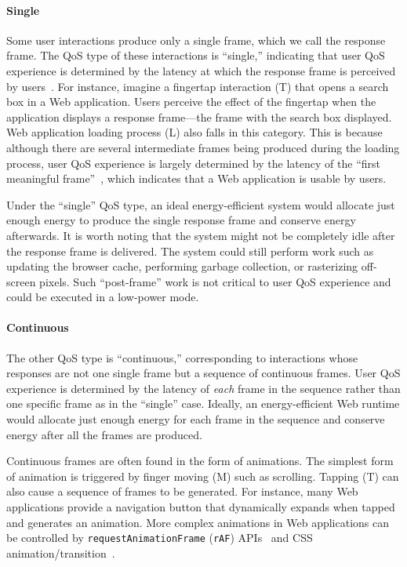 \paragraph{Single} Some user interactions produce only a single frame, which we call the response frame. The QoS type of these interactions is ``single,'' indicating that user QoS experience is determined by the latency at which the response frame is perceived by users~\cite{eventlatency}. For instance, imagine a fingertap interaction (T) that opens a search box in a Web application. Users perceive the effect of the fingertap when the application displays a response frame---the frame with the search box displayed. Web application loading process (L) also falls in this category. This is because although there are several intermediate frames being produced during the loading process, user QoS experience is largely determined by the latency of the ``first meaningful frame''~\cite{fmf}, which indicates that a Web application is usable by users.

Under the ``single'' QoS type, an ideal energy-efficient system would allocate just enough energy to produce the single response frame and conserve energy afterwards. It is worth noting that the system might not be completely idle after the response frame is delivered. The system could still perform work such as updating the browser cache, performing garbage collection, or rasterizing off-screen pixels. Such ``post-frame'' work is not critical to user QoS experience and could be executed in a low-power mode.

\paragraph{Continuous} The other QoS type is ``continuous,'' corresponding to interactions whose responses are not one single frame but a sequence of continuous frames. User QoS experience is determined by the latency of \textit{each} frame in the sequence rather than one specific frame as in the ``single'' case. Ideally, an energy-efficient Web runtime would allocate just enough energy for each frame in the sequence and conserve energy after all the frames are produced.

Continuous frames are often found in the form of animations. The simplest form of animation is triggered by finger moving (M) such as scrolling. Tapping (T) can also cause a sequence of frames to be generated. For instance, many Web applications provide a navigation button that dynamically expands when tapped and generates an animation. More complex animations in Web applications can be controlled by \texttt{requestAnimationFrame} (\texttt{rAF}) APIs~\cite{animationtiming} and CSS animation/transition~\cite{cssanimations,csstransitions}.

